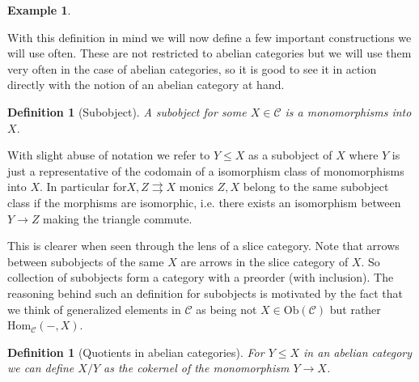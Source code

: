 \documentclass[12pt]{article}
\numberwithin{equation}{section}
\newcommand{\Hom}{{\mathrm{Hom}}}
\newcounter{dummy} \numberwithin{dummy}{section}
\newtheorem{definition}[dummy]{Definition}
\newtheorem{example}[dummy]{Example}
\begin{document}
\begin{example}
\begin{enumerate}
		\end{enumerate}
	\end{example}
	
	With this definition in mind we will now define a few important constructions we will use often. These are not restricted to abelian categories but we will use them very often in the case of abelian categories, so it is good to see it in action directly with the notion of an abelian category at hand.
	\begin{definition}[Subobject]
		A subobject for some $X \in \mathcal{C}$ is a monomorphisms into $X$. 
	\end{definition}
	
	
	With slight abuse of notation we refer to $Y \leq X$ as a subobject of $X$ where $Y$ is just a representative of the codomain of a isomorphism class of monomorphisms into $X$. In particular for$X, Z \rightrightarrows X$ monics $Z, X$ belong to the same subobject class if the morphisms are isomorphic, i.e. there exists an isomorphism between $Y \to Z$ making the triangle commute. 
	
	This is clearer when seen through the lens of a slice category. Note that arrows between subobjects of the same $X$ are arrows in the slice category of $X$. So collection of subobjects form a category with a preorder (with inclusion). The reasoning behind such an definition for subobjects is motivated by the fact that we think of generalized elements in $\mathcal{C} $ as being not $X \in \mathrm{Ob}(\mathcal{C}) $ but rather $\Hom_\mathcal{C}(-,X)$.
	
	\begin{definition}[Quotients in abelian categories]
		For $Y \leq X$ in an abelian category we can define $X/Y $ as the cokernel of the monomorphism $Y \to X$. 
	\end{definition}
	
\end{document}

